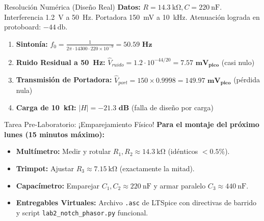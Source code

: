 \documentclass[aspectratio=169, 10pt]{beamer}
\begin{document}
\begin{frame}{Resolución Numérica (Diseño Real)}
    \textbf{Datos:} $R = \qty{14.3}{\kilo\ohm}, C = \qty{220}{\nano\farad}$. Interferencia \qty{1.2}{\volt} a \qty{50}{\hertz}. Portadora \qty{150}{\milli\volt} a \qty{10}{\kilo\hertz}. Atenuación lograda en protoboard: $\qty{-44}{\decibel}$.
    \vspace{0.3cm}
    \begin{enumerate}
        \setlength{\itemsep}{6pt}
        \item \textbf{Sintonía:} $f_0 = \frac{1}{2\pi \cdot 14300 \cdot 220\times 10^{-9}} = \mathbf{50.59\text{ Hz}}$
        \item \textbf{Ruido Residual a \qty{50}{\hertz}:} $\hat{V}_{ruido} = 1.2 \cdot 10^{-44/20} = \mathbf{7.57\text{ mV}_{pico}}$ (casi nulo)
        \item \textbf{Transmisión de Portadora:} $\hat{V}_{port} = 150 \times 0.9998 = \mathbf{149.97\text{ mV}_{pico}}$ (pérdida nula)
        \item \textbf{Carga de \qty{10}{\kilo\ohm}:} $\vert{}H\vert{} = \mathbf{-21.3\text{ dB}}$ (falla de diseño por carga)
    \end{enumerate}
\end{frame}

\begin{frame}{Tarea Pre-Laboratorio: ¡Emparejamiento Físico!}
    \textbf{Para el montaje del próximo lunes (15 minutos máximo):}
    \vspace{0.3cm}
    \begin{itemize}
        \setlength{\itemsep}{5pt}
        \item \textbf{Multímetro:} Medir y rotular $R_1, R_2 \approx \qty{14.3}{\kilo\ohm}$ (idénticos $< 0.5\%$).
        \item \textbf{Trimpot:} Ajustar $R_3 \approx \qty{7.15}{\kilo\ohm}$ (exactamente la mitad).
        \item \textbf{Capacímetro:} Emparejar $C_1, C_2 \approx \qty{220}{\nano\farad}$ y armar paralelo $C_3 \approx \qty{440}{\nano\farad}$.
        \item \textbf{Entregables Virtuales:} Archivo \texttt{.asc} de LTSpice con directivas de barrido y script \texttt{lab2\_notch\_phasor.py} funcional.
    \end{itemize}
\end{frame}
\end{document}
